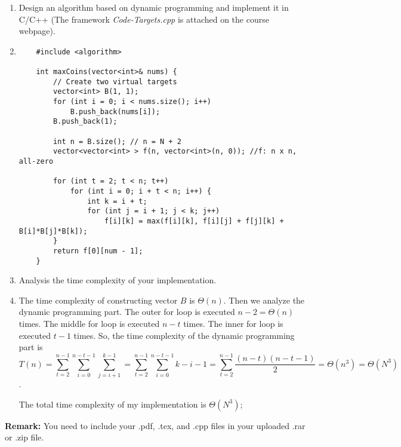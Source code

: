 \documentclass[12pt,a4paper]{article}
\makeatletter
\newtheorem*{solution}{Solution}
\theoremstyle{definition}
\renewenvironment{solution}[1][Solution] {\par\pushQED{\qed}\normalfont\topsep6\p@\@plus6\p@\relax\trivlist\item[\hskip\labelsep\bfseries#1\@addpunct{.}]\ignorespaces}{\popQED\endtrivlist\@endpefalse} \makeatother
\makeatother
\begin{document}
\begin{enumerate}
\begin{enumerate}
\item
Design an algorithm based on dynamic programming and implement it in C/C++ {\color{blue}(The framework \emph{Code-Targets.cpp} is attached on the course webpage)}.

\begin{solution}\quad
	
	\begin{verbatim}
	#include <algorithm>
	
	int maxCoins(vector<int>& nums) {
	    // Create two virtual targets
	    vector<int> B(1, 1);
	    for (int i = 0; i < nums.size(); i++)
	        B.push_back(nums[i]);
	    B.push_back(1);
		
	    int n = B.size(); // n = N + 2
	    vector<vector<int> > f(n, vector<int>(n, 0)); //f: n x n, all-zero
	    
	    for (int t = 2; t < n; t++)
	        for (int i = 0; i + t < n; i++) {
	            int k = i + t;
	            for (int j = i + 1; j < k; j++)
	                f[i][k] = max(f[i][k], f[i][j] + f[j][k] + B[i]*B[j]*B[k]);
	    }
	    return f[0][num - 1];
	}
	\end{verbatim}
	
\end{solution}

\item
Analysis the time complexity of your implementation.

\begin{solution}
	The time complexity of constructing vector $B$ is $\Theta(n)$. Then we analyze the dynamic programming part. The outer for loop is executed $n-2=\Theta(n)$ times. The middle for loop is executed $n-t$ times. The inner for loop is executed $t-1$ times. So, the time complexity of the dynamic programming part is 
	$$T(n)=\sum_{t=2}^{n-1}\sum_{i=0}^{n-t-1}\sum_{j=i+1}^{k-1}=\sum_{t=2}^{n-1}\sum_{i=0}^{n-t-1}k-i-1=\sum_{t=2}^{n-1}\frac{(n-t)(n-t-1)}{2}=\Theta(n^3)=\Theta(N^3)$$.
	
	The total time complexity of my implementation is $\Theta(N^3)$;
	
\end{solution}

\end{enumerate}

\end{enumerate}

\vspace{20pt}

\textbf{Remark:} You need to include your .pdf, .tex, and .cpp files in your uploaded .rar or .zip file.

\end{document}
